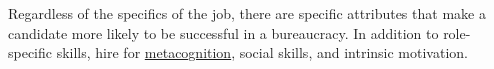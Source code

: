 
Regardless of the specifics of the job, there are specific attributes that make a candidate more likely to be successful in a bureaucracy. In addition to role-specific skills, hire for \href{https://en.wikipedia.org/wiki/Metacognition}{metacognition},
\iftoggle{WPinmargin}{\marginpar{[Wikipedia] Metacognition}}{}
social skills, and intrinsic motivation.




